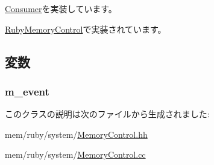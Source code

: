 \hyperlink{classConsumer_a623e3e7d1b1c725d70009f7b01a421b9}{Consumer}を実装しています。

\hyperlink{classRubyMemoryControl_ae674290a26ecbd622c5160e38e8a4fe9}{RubyMemoryControl}で実装されています。

\subsection{変数}
\hypertarget{classMemoryControl_abbf06cc9d10fae424e60034190a2b38f}{
\subsubsection[{m\_\-event}]{ {\bf m\_\-event}}}
\label{classMemoryControl_abbf06cc9d10fae424e60034190a2b38f}


このクラスの説明は次のファイルから生成されました:\begin{DoxyCompactItemize}
\item 
mem/ruby/system/\hyperlink{MemoryControl_8hh}{MemoryControl.hh}\item 
mem/ruby/system/\hyperlink{MemoryControl_8cc}{MemoryControl.cc}\end{DoxyCompactItemize}
